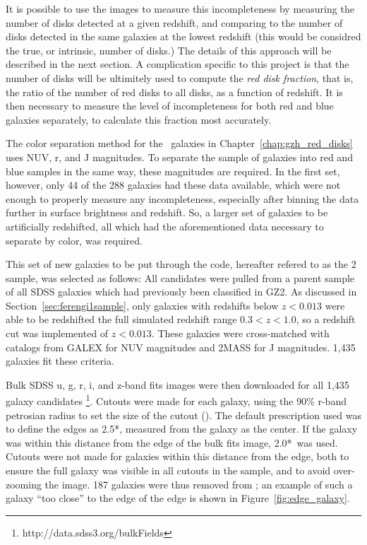 It is possible to use the \ferengi{} images to measure this incompleteness by measuring the number of disks detected at a given redshift, and comparing to the number of disks detected in the same galaxies at the lowest redshift (this would be considred the true, or intrinsic, number of disks.) The details of this approach will be described in the next section. A complication specific to this project is that the number of disks will be ultimitely used to compute the \emph{red disk fraction}, that is, the ratio of the number of red disks to all disks, as a function of redshift. It is then necessary to measure the level of incompleteness for both red and blue galaxies separately, to calculate this fraction most accurately.

The color separation method for the \hst~galaxies in Chapter~\ref{chap:gzh_red_disks} uses NUV, r, and J magnitudes. To separate the \ferengi{} sample of galaxies into red and blue samples in the same way, these magnitudes are required. In the first set, however, only 44 of the 288 galaxies had these data available, which were not enough to properly measure any incompleteness, especially after binning the data further in surface brightness and redshift. So, a larger set of galaxies to be artificially redshifted, all which had the aforementioned data necessary to separate by color, was required.

This set of new galaxies to be put through the \ferengi{} code, hereafter refered to as the \ferengi{} 2 sample, was selected as follows: All candidates were pulled from a parent sample of all SDSS galaxies which had previously been classified in GZ2. As discussed in Section~\ref{sec:ferengi1sample}, only galaxies with redshifts below $z<0.013$ were able to be redshifted the full simulated redshift range $0.3<z<1.0$, so a redshift cut was implemented of $z<0.013$. These galaxies were cross-matched with catalogs from GALEX \citep{Martin2005} for NUV magnitudes and 2MASS \citep{Skrutskie2006} for J magnitudes. 1,435 galaxies fit these criteria.  

Bulk SDSS u, g, r, i, and z-band fits images were then downloaded for all 1,435 galaxy candidates \footnote{http://data.sdss3.org/bulkFields}. Cutouts were made for each galaxy, using the 90\% r-band petrosian radius to set the size of the cutout (\radr). The default prescription used was to define the edges as 2.5*\radr, measured from the galaxy as the center. If the galaxy was within this distance from the edge of the bulk fits image, 2.0*\radr~was used. Cutouts were not made for galaxies within this distance from the edge, both to ensure the full galaxy was visible in all cutouts in the sample, and to avoid over-zooming the image. 187 galaxies were thus removed from ; an example of such a galaxy ``too close'' to the edge of the edge is shown in Figure~\ref{fig:edge_galaxy}.  



